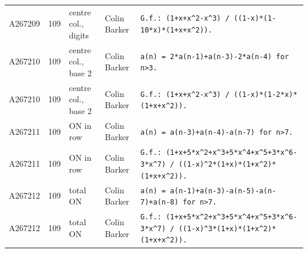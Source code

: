 \documentclass[11pt]{article}
\theoremstyle{definition}
\theoremstyle{remark}
\begin{document}
{\begin{longtable}{p{1.3cm}p{0.7cm}p{2.4cm}p{2.3cm}p{7.3cm}}
A267209 & 109 & centre col., digits & Colin Barker & \texttt{G.f.: \allowbreak{}(1+\allowbreak{}x+\allowbreak{}x\^{}2-\allowbreak{}x\^{}3)\allowbreak{} \allowbreak{}/\allowbreak{} \allowbreak{}((1-\allowbreak{}x)\allowbreak{}*\allowbreak{}(1-\allowbreak{}10*\allowbreak{}x)\allowbreak{}*\allowbreak{}(1+\allowbreak{}x+\allowbreak{}x\^{}2)\allowbreak{})\allowbreak{}.} \\
A267210 & 109 & centre col., base 2 & Colin Barker & \texttt{a(n)\allowbreak{} \allowbreak{}=\allowbreak{} \allowbreak{}2*\allowbreak{}a(n-\allowbreak{}1)\allowbreak{}+\allowbreak{}a(n-\allowbreak{}3)\allowbreak{}-\allowbreak{}2*\allowbreak{}a(n-\allowbreak{}4)\allowbreak{} \allowbreak{}for \allowbreak{}n>3.} \\
A267210 & 109 & centre col., base 2 & Colin Barker & \texttt{G.f.: \allowbreak{}(1+\allowbreak{}x+\allowbreak{}x\^{}2-\allowbreak{}x\^{}3)\allowbreak{} \allowbreak{}/\allowbreak{} \allowbreak{}((1-\allowbreak{}x)\allowbreak{}*\allowbreak{}(1-\allowbreak{}2*\allowbreak{}x)\allowbreak{}*\allowbreak{}(1+\allowbreak{}x+\allowbreak{}x\^{}2)\allowbreak{})\allowbreak{}.} \\
A267211 & 109 & ON in row & Colin Barker & \texttt{a(n)\allowbreak{} \allowbreak{}=\allowbreak{} \allowbreak{}a(n-\allowbreak{}3)\allowbreak{}+\allowbreak{}a(n-\allowbreak{}4)\allowbreak{}-\allowbreak{}a(n-\allowbreak{}7)\allowbreak{} \allowbreak{}for \allowbreak{}n>7.} \\
A267211 & 109 & ON in row & Colin Barker & \texttt{G.f.: \allowbreak{}(1+\allowbreak{}x+\allowbreak{}5*\allowbreak{}x\^{}2+\allowbreak{}x\^{}3+\allowbreak{}5*\allowbreak{}x\^{}4+\allowbreak{}x\^{}5+\allowbreak{}3*\allowbreak{}x\^{}6-\allowbreak{}3*\allowbreak{}x\^{}7)\allowbreak{} \allowbreak{}/\allowbreak{} \allowbreak{}((1-\allowbreak{}x)\allowbreak{}\^{}2*\allowbreak{}(1+\allowbreak{}x)\allowbreak{}*\allowbreak{}(1+\allowbreak{}x\^{}2)\allowbreak{}*\allowbreak{}(1+\allowbreak{}x+\allowbreak{}x\^{}2)\allowbreak{})\allowbreak{}.} \\
A267212 & 109 & total ON & Colin Barker & \texttt{a(n)\allowbreak{} \allowbreak{}=\allowbreak{} \allowbreak{}a(n-\allowbreak{}1)\allowbreak{}+\allowbreak{}a(n-\allowbreak{}3)\allowbreak{}-\allowbreak{}a(n-\allowbreak{}5)\allowbreak{}-\allowbreak{}a(n-\allowbreak{}7)\allowbreak{}+\allowbreak{}a(n-\allowbreak{}8)\allowbreak{} \allowbreak{}for \allowbreak{}n>7.} \\
A267212 & 109 & total ON & Colin Barker & \texttt{G.f.: \allowbreak{}(1+\allowbreak{}x+\allowbreak{}5*\allowbreak{}x\^{}2+\allowbreak{}x\^{}3+\allowbreak{}5*\allowbreak{}x\^{}4+\allowbreak{}x\^{}5+\allowbreak{}3*\allowbreak{}x\^{}6-\allowbreak{}3*\allowbreak{}x\^{}7)\allowbreak{} \allowbreak{}/\allowbreak{} \allowbreak{}((1-\allowbreak{}x)\allowbreak{}\^{}3*\allowbreak{}(1+\allowbreak{}x)\allowbreak{}*\allowbreak{}(1+\allowbreak{}x\^{}2)\allowbreak{}*\allowbreak{}(1+\allowbreak{}x+\allowbreak{}x\^{}2)\allowbreak{})\allowbreak{}.} \\

\end{longtable}}
\end{document}
